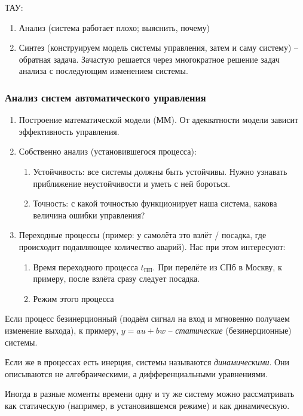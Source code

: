 \documentclass[main.tex]{subfiles}
\begin{document}
ТАУ:

\begin{enumerate}[noitemsep]
	\item Анализ (система работает плохо; выяснить, почему)
	\item Синтез (конструируем модель системы управления, затем и саму систему) -- обратная задача.
	Зачастую решается через многократное решение задач анализа с последующим изменением системы.
\end{enumerate}

\subsubsection{Анализ систем автоматического управления}

\begin{enumerate}[noitemsep]
	\item Построение математической модели (ММ). От адекватности модели зависит эффективность управления.
	\item Собственно анализ (установившегося процесса):
	\begin{enumerate}[noitemsep]
		\item Устойчивость: все системы должны быть устойчивы.
		Нужно узнавать приближение неустойчивости и уметь с ней бороться.
		\item Точность: с какой точностью функционирует наша система, какова величина ошибки управления?
	\end{enumerate}
	\item Переходные процессы (пример: у самолёта это взлёт / посадка, где происходит подавляющее количество аварий).
	Нас при этом интересуют:
	\begin{enumerate}[noitemsep]
		\item Время переходного процесса $ t_{\text{ПП}} $. При перелёте из СПб в Москву, к примеру, после взлёта сразу следует посадка.
		\item Режим этого процесса
	\end{enumerate}
\end{enumerate}

Если процесс безинерционный (подаём сигнал на вход и мгновенно получаем изменение выхода), к примеру, $ y = au + bw $ -- \emph{статические} (безинерционные) системы.

Если же в процессах есть инерция, системы называются \emph{динамическими}.
Они описываются не алгебраическими, а дифференциальными уравнениями.

Иногда в разные моменты времени одну и ту же систему можно рассматривать как статическую (например, в установившемся режиме) и как динамическую.
\end{document}
